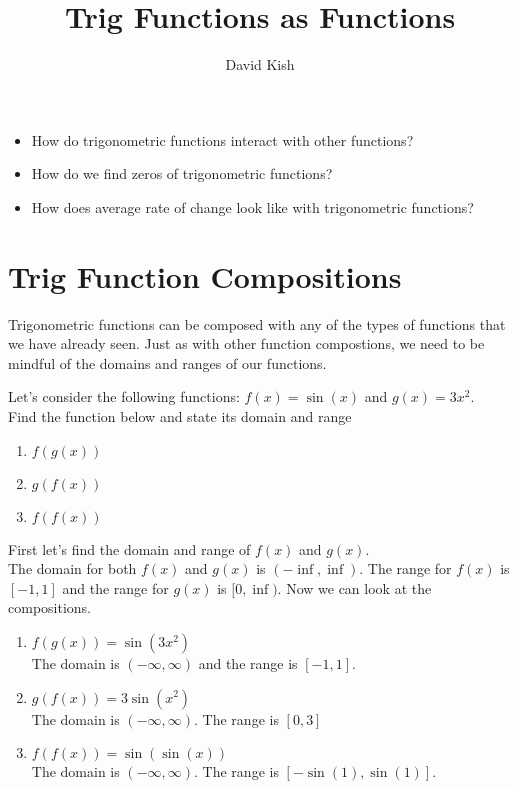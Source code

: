 \documentclass{ximera}
\author{David Kish}
\title{Trig Functions as Functions}
\begin{document}
\begin{abstract}
  
\end{abstract}
\maketitle



\begin{motivatingQuestions}
\begin{itemize}
\item How do trigonometric functions interact with other functions?
\item How do we find zeros of trigonometric functions?
\item How does average rate of change look like with trigonometric functions?
\end{itemize}
\end{motivatingQuestions}
\section{Trig Function Compositions}

Trigonometric functions can be composed with any of the types of functions that we have already seen. Just as with other function compostions, we need to be mindful of the domains and ranges of our functions.

\begin{example}
Let's consider the following functions: $f(x)=\sin{(x)}$ and $g(x)=3x^2$.
\\
Find the function below and state its domain and range
\begin{enumerate}
\item $f(g(x))$
\item $g(f(x))$
\item $f(f(x))$
\end{enumerate}

\begin{explanation}
First let's find the domain and range of $f(x)$ and $g(x)$.\\
The domain for both $f(x)$ and $g(x)$ is $(-\inf , \inf)$. The range for $f(x)$ is $[-1,1]$ and the range for $g(x)$ is $[0,\inf)$. Now we can look at the compositions.
\begin{enumerate}
\item $f(g(x))= \sin(3x^2)$\\
The domain is $(-\infty , \infty)$ and the range is $[-1,1]$.
\item $g(f(x)) =3\sin(x^2)$\\
The domain is $(-\infty , \infty)$. The range is $[0,3]$
\item $f(f(x))= \sin(\sin(x))$\\
The domain is $(-\infty , \infty)$. The range is $[-\sin(1), \sin(1)]$.
\end{enumerate}
\end{explanation}
\end{example}
\end{document}
